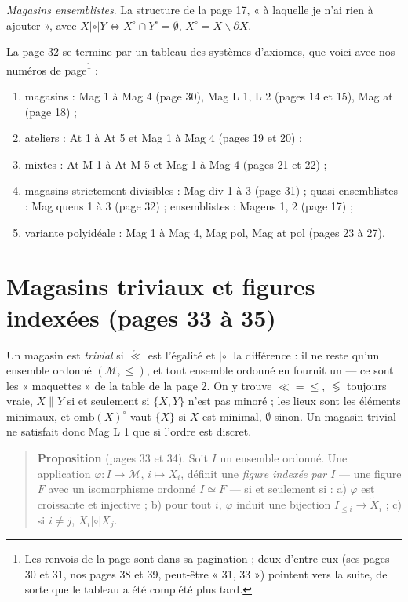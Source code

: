 \documentclass[11pt,a4paper]{article}
\begin{document}
\emph{Magasins ensemblistes}. La structure de la page 17, « à laquelle je n'ai
rien à ajouter », avec $X \mathrel{|\circ|} Y \iff X^{\circ} \cap Y^{\circ} =
\emptyset$, $X^{\circ} = X \smallsetminus \partial X$.

La page 32 se termine par un tableau des systèmes d'axiomes, que voici avec nos
numéros de page\footnote{Les renvois de la page sont dans sa pagination ; deux
d'entre eux (ses pages 30 et 31, nos pages 38 et 39, peut-être « 31, 33 »)
pointent vers la suite, de sorte que le tableau a été complété plus tard.} :
\begin{enumerate}
\item[--] magasins : Mag 1 à Mag 4 (page 30), Mag L 1, L 2 (pages 14 et 15),
Mag at (page 18) ;
\item[--] ateliers : At 1 à At 5 et Mag 1 à Mag 4 (pages 19 et 20) ;
\item[--] mixtes : At M 1 à At M 5 et Mag 1 à Mag 4 (pages 21 et 22) ;
\item[--] magasins strictement divisibles : Mag div 1 à 3 (page 31) ;
quasi-ensemblistes : Mag quens 1 à 3 (page 32) ; ensemblistes : Magens 1, 2
(page 17) ;
\item[--] variante polyidéale : Mag 1 à Mag 4, Mag pol, Mag at pol (pages 23 à
27).
\end{enumerate}

\section*{Magasins triviaux et figures indexées (pages 33 à 35)}

Un magasin est \emph{trivial} si $\mathring{\ll}$ est l'égalité et
$\mathrel{|\circ|}$ la différence : il ne reste qu'un ensemble ordonné
$(\mathcal{M}, \leq)$, et tout ensemble ordonné en fournit un --- ce sont les
« maquettes » de la table de la page 2. On y trouve $\ll = \leq$, $\lessgtr$
toujours vraie, $X \parallel Y$ si et seulement si $\{X, Y\}$ n'est pas minoré ;
les lieux sont les éléments minimaux, et $\mathrm{omb}(X)^{\circ}$ vaut $\{X\}$
si $X$ est minimal, $\emptyset$ sinon. Un magasin trivial ne satisfait donc Mag
L 1 que si l'ordre est discret.

\begin{quote}
\textbf{Proposition} (pages 33 et 34). Soit $I$ un ensemble ordonné. Une
application $\varphi : I \to \mathcal{M}$, $i \mapsto X_{i}$, définit une
\emph{figure indexée par $I$} --- une figure $F$ avec un isomorphisme ordonné $I
\simeq F$ --- si et seulement si : a) $\varphi$ est croissante et injective ;
b) pour tout $i$, $\varphi$ induit une bijection $I_{\leq i} \to
\widetilde{X}_{i}$ ; c) si $i \neq j$, $X_{i} \mathrel{|\circ|} X_{j}$.
\end{quote}
\end{document}
